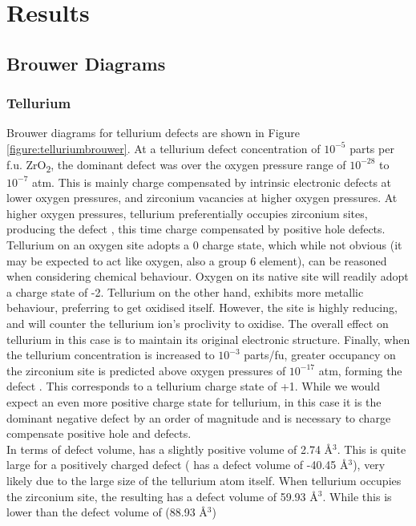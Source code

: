 \documentclass[11pt,a4paper]{article}
\newcommand{\zirconia}{ZrO\textsubscript{2}}
\begin{document}
\section{Results} \label{Results}

\subsection{Brouwer Diagrams} \label{Formation}

\subsubsection*{Tellurium}

Brouwer diagrams for tellurium defects are shown in Figure \ref{figure:telluriumbrouwer}. At a tellurium defect concentration of $10^{-5}$ parts per f.u. \zirconia , the dominant defect was  over the oxygen pressure range of $10^{-28}$ to $10^{-7}$ atm. This is mainly charge compensated by intrinsic electronic defects at lower oxygen pressures, and zirconium vacancies at higher oxygen pressures. At higher oxygen pressures, tellurium preferentially occupies zirconium sites, producing the defect , this time charge compensated by positive hole defects. \\

Tellurium on an oxygen site adopts a 0 charge state, which while not obvious (it may be expected to act like oxygen, also a group 6 element), can be reasoned when considering chemical behaviour. Oxygen on its native site will readily adopt a charge state of -2. Tellurium on the other hand, exhibits more metallic behaviour, preferring to get oxidised itself. However, the  site is highly reducing, and will counter the tellurium ion's proclivity to oxidise. The overall effect on tellurium in this case is to maintain its original electronic structure. Finally, when the tellurium concentration is increased to $10^{-3}$ parts/fu, greater occupancy on the zirconium site is predicted above oxygen pressures of $10^{-17}$ atm, forming the defect . This corresponds to a tellurium charge state of +1. While we would expect an even more positive charge state for tellurium, in this case it is the dominant negative defect by an order of magnitude and is necessary to charge compensate positive hole and  defects. \\

In terms of defect volume,  has a slightly positive volume of 2.74 \r{A}$^{3}$. This is quite large for a positively charged defect ( has a defect volume of -40.45 \r{A}$^{3}$), very likely due to the large size of the tellurium atom itself. When tellurium occupies the zirconium site, the resulting  has a defect volume of 59.93 \r{A}$^{3}$. While this is lower than the defect volume of  (88.93 \r{A}$^{3}$)
\end{document}
